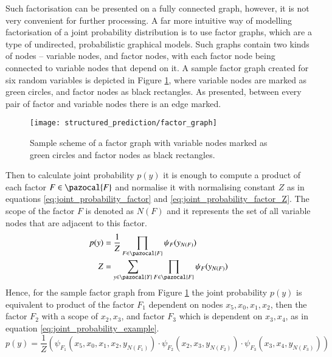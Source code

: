 Such factorisation can be presented on a fully connected graph, however, it is not very convenient for further processing. A far more intuitive way of modelling factorisation of a joint probability distribution is to use factor graphs, which are a type of undirected, probabilistic graphical models. Such graphs contain two kinds of nodes – variable nodes, and factor nodes, with each factor node being connected to variable nodes that depend on it. A sample factor graph created for six random variables is depicted in Figure \ref{fig:factor_graph}, where variable nodes are marked as green circles, and factor nodes as black rectangles. As presented, between every pair of factor and variable nodes there is an edge marked.
\begin{figure}[ht]
    \centering
    \texttt{[image: structured\_prediction/factor\_graph]}
    \caption[Sample scheme of a factor graph.]{Sample scheme of a factor graph with variable nodes marked as green circles and factor nodes as black rectangles.}
     \label{fig:factor_graph}
\end{figure}

Then to calculate joint probability $p(y)$ it is enough to compute a product of each factor $F \in \pazocal{F}$ and normalise it with normalising constant $Z$ as in equations \ref{eq:joint_probability_factor} and \ref{eq:joint_probability_factor_Z}. The scope of the factor $F$ is denoted as $N(F)$ and it represents the set of all variable nodes that are adjacent to this factor.
\begin{align}
    \label{eq:joint_probability_factor}
    p(y) &= \frac{1}{Z}\prod_{F\in \pazocal{F}}\psi_{F}({y_{N(F)}}) \\
    \label{eq:joint_probability_factor_Z}
     Z &=\sum_{y\in \pazocal{Y}}\prod_{F\in \pazocal{F}}\psi_{F}({y_{N(F)}})
\end{align}
Hence, for the sample factor graph from Figure \ref{fig:factor_graph} the joint probability $p(y)$ is equivalent to product of the factor $F_1$ dependent on nodes $x_5, x_0, x_1, x_2$, then the factor $F_2$ with a scope of $x_2, x_3$, and factor $F_3$ which is dependent on $x_3, x_4$, as in equation \ref{eq:joint_probability_example}.
\begin{equation}
    \label{eq:joint_probability_example}
    p(y)=\frac{1}{Z}(\psi_{F_1}(x_5,x_0,x_1,x_2,y_{N(F_1)}) \cdot \psi_{F_2}(x_2,x_3,y_{N(F_2)}) \cdot \psi_{F_3}(x_3,x_4,y_{N(F_3)}))
\end{equation}

